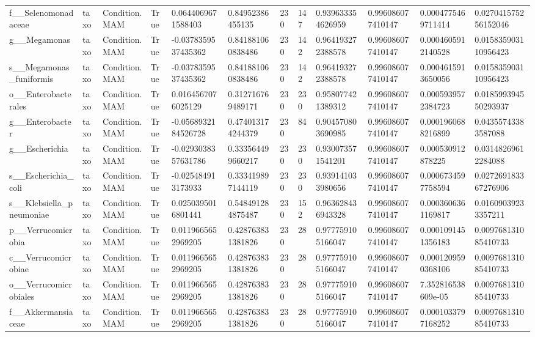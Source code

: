 \begin{longtable}{llllllllllll}
f\_\_Selenomonadaceae & taxo & Condition.MAM & True & 0.0644069671588403 & 0.84952386455135 & 230 & 147 & 0.939633354626959 & 0.996086077410147 & 0.0004775469711414 & 0.027041575256152046 \\
g\_\_Megamonas & taxo & Condition.MAM & True & -0.0378359537435362 & 0.841881060838486 & 230 & 142 & 0.964193272388578 & 0.996086077410147 & 0.0004605912140528 & 0.015835903110956423 \\
s\_\_Megamonas\_funiformis & taxo & Condition.MAM & True & -0.0378359537435362 & 0.841881060838486 & 230 & 142 & 0.964193272388578 & 0.996086077410147 & 0.0004615913650056 & 0.015835903110956423 \\
o\_\_Enterobacterales & taxo & Condition.MAM & True & 0.0164567076025129 & 0.312716769489171 & 230 & 230 & 0.958077421389312 & 0.996086077410147 & 0.0005939572384723 & 0.018599394550293937 \\
g\_\_Enterobacter & taxo & Condition.MAM & True & -0.0568932184526728 & 0.474013174244379 & 230 & 84 & 0.904570803690985 & 0.996086077410147 & 0.0001960688216899 & 0.04355743383587088 \\
g\_\_Escherichia & taxo & Condition.MAM & True & -0.0293038357631786 & 0.333564499660217 & 230 & 230 & 0.930073571541201 & 0.996086077410147 & 0.000530912878225 & 0.03148269612284088 \\
s\_\_Escherichia\_coli & taxo & Condition.MAM & True & -0.025484913173933 & 0.333419897144119 & 230 & 230 & 0.939141033980656 & 0.996086077410147 & 0.0006734597758594 & 0.027269183367276906 \\
s\_\_Klebsiella\_pneumoniae & taxo & Condition.MAM & True & 0.0250395016801441 & 0.548491284875487 & 230 & 152 & 0.963628436943328 & 0.996086077410147 & 0.0003606361169817 & 0.01609039233357211 \\
p\_\_Verrucomicrobia & taxo & Condition.MAM & True & 0.0119665652969205 & 0.428763831381826 & 230 & 28 & 0.977759105166047 & 0.996086077410147 & 0.0001091451356183 & 0.009768131085410733 \\
c\_\_Verrucomicrobiae & taxo & Condition.MAM & True & 0.0119665652969205 & 0.428763831381826 & 230 & 28 & 0.977759105166047 & 0.996086077410147 & 0.0001209590368106 & 0.009768131085410733 \\
o\_\_Verrucomicrobiales & taxo & Condition.MAM & True & 0.0119665652969205 & 0.428763831381826 & 230 & 28 & 0.977759105166047 & 0.996086077410147 & 7.352816538609e-05 & 0.009768131085410733 \\
f\_\_Akkermansiaceae & taxo & Condition.MAM & True & 0.0119665652969205 & 0.428763831381826 & 230 & 28 & 0.977759105166047 & 0.996086077410147 & 0.0001033797168252 & 0.009768131085410733 \\

\end{longtable}
